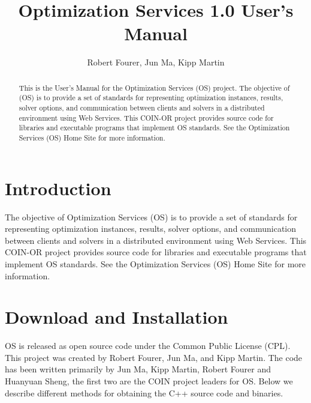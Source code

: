 \documentclass[12pt]{article}
\renewcommand{\_}{{\char"5F}}
\renewcommand{\{}{{\char"7B}}
\renewcommand{\}}{{\char"7D}}
\renewcommand{\^}{{\char"0D}}
\renewcommand{\'}{{\char"0D}}
\begin{document}
\title{Optimization Services 1.0 User's Manual }
\vskip 2in
\author{Robert Fourer, Jun Ma, Kipp Martin}
\maketitle

\begin{abstract}
This is the User's Manual for the Optimization Services (OS) project.  The objective of  (OS) is to provide a set of standards for representing optimization instances, results, solver options, and communication between clients and solvers in a distributed environment using Web Services. This COIN-OR project provides source code for libraries and executable programs that implement OS standards. See the Optimization Services (OS) Home Site for more information.
\end{abstract}


\newpage
\tableofcontents
\listoffigures
\listoftables
{}










\newpage

\section{Introduction}

The objective of Optimization Services (OS) is to provide a set of standards for representing optimization instances, results, solver options, and communication between clients and solvers in a distributed environment using Web Services. This COIN-OR project provides source code for libraries and executable programs that implement OS standards. See the Optimization Services (OS) Home Site for more information.


\section{Download and Installation}

OS is released as open source code under the Common Public License (CPL). This project was created by Robert Fourer, Jun Ma, and Kipp Martin. The code has been written primarily by Jun Ma, Kipp Martin, Robert Fourer and Huanyuan Sheng, the first two are the COIN project leaders for OS. Below we describe different methods for obtaining the C++ source code and binaries. 
\end{document}
